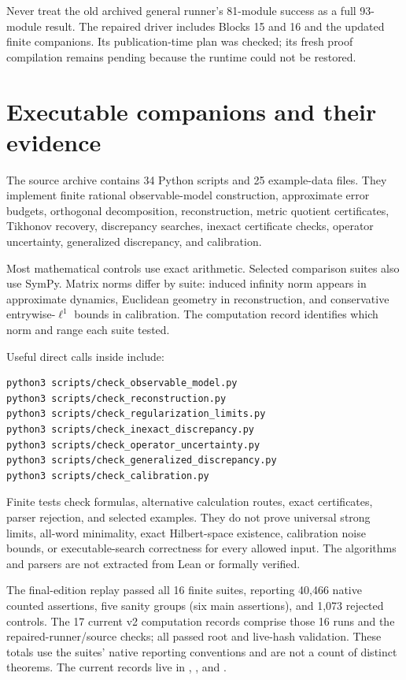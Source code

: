 \documentclass[11pt]{article}
\begin{document}
Never treat the old archived general runner's 81-module success as a
full 93-module result. The repaired driver includes Blocks 15 and 16 and
the updated finite companions. Its publication-time plan was checked;
its fresh proof compilation remains pending because the runtime could
not be restored.

\hypertarget{executable-companions-and-their-evidence}{%
\section{Executable companions and their
evidence}\label{executable-companions-and-their-evidence}}

The source archive contains 34 Python scripts and 25 example-data files.
They implement finite rational observable-model construction,
approximate error budgets, orthogonal decomposition, reconstruction,
metric quotient certificates, Tikhonov recovery, discrepancy searches,
inexact certificate checks, operator uncertainty, generalized
discrepancy, and calibration.

Most mathematical controls use exact
\texttt{} arithmetic. Selected
comparison suites also use SymPy. Matrix norms differ by suite: induced
infinity norm appears in approximate dynamics, Euclidean geometry in
reconstruction, and conservative entrywise-\(\ell^1\) bounds in
calibration. The computation record identifies which norm and range each
suite tested.

Useful direct calls inside \texttt{} include:

\begin{lstlisting}
python3 scripts/check_observable_model.py
python3 scripts/check_reconstruction.py
python3 scripts/check_regularization_limits.py
python3 scripts/check_inexact_discrepancy.py
python3 scripts/check_operator_uncertainty.py
python3 scripts/check_generalized_discrepancy.py
python3 scripts/check_calibration.py
\end{lstlisting}

Finite tests check formulas, alternative calculation routes, exact
certificates, parser rejection, and selected examples. They do not prove
universal strong limits, all-word minimality, exact Hilbert-space
existence, calibration noise bounds, or executable-search correctness
for every allowed input. The algorithms and parsers are not extracted
from Lean or formally verified.

The final-edition replay passed all 16 finite suites, reporting 40,466
native counted assertions, five sanity groups (six main assertions), and
1,073 rejected controls. The 17 current v2 computation records comprise
those 16 runs and the repaired-runner/source checks; all passed root and
live-hash validation. These totals use the suites' native reporting
conventions and are not a count of distinct theorems. The current
records live in \texttt{},
\texttt{}, and
\texttt{}.
\end{document}
